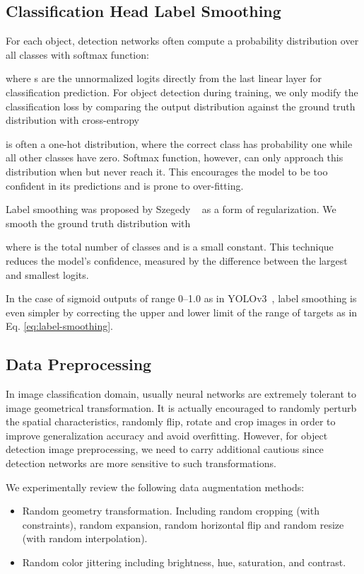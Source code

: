 \documentclass[10pt,twocolumn,letterpaper]{article}
\begin{document}
\subsection{Classification Head Label Smoothing}
For each object, detection networks often compute a probability distribution over all classes with softmax function:



where s are the unnormalized logits directly from the last linear layer for classification prediction. For object detection during training, we only modify the classification loss by comparing the output distribution  against the ground truth distribution  with cross-entropy



 is often a one-hot distribution, where the correct class has probability one while all other classes have zero. Softmax function, however, can only approach this distribution when  but never reach it. This encourages the model to be too confident in its predictions and is prone to over-fitting.

Label smoothing was proposed by Szegedy \etal~\cite{szegedy2016rethinking} as a form of regularization. We smooth the ground truth distribution with

where  is the total number of classes and  is a small constant. This technique reduces the model's confidence, measured by the difference between the largest and smallest logits.

In the case of sigmoid outputs of range \numrange{0}{1.0} as in YOLOv3~\cite{redmon2018yolov3}, label smoothing is even simpler by correcting the upper and lower limit of the range of targets as in Eq. \ref{eq:label-smoothing}.

\subsection{Data Preprocessing}
In image classification domain, usually neural networks are extremely tolerant to image geometrical transformation. It is actually encouraged to randomly perturb the spatial characteristics, \eg randomly flip, rotate and crop images in order to improve generalization accuracy and avoid overfitting. However, for object detection image preprocessing,  we need to carry additional cautious since detection networks are more sensitive to such transformations. 

We experimentally review the following data augmentation methods:

\begin{itemize}
   \item Random geometry transformation. Including random cropping (with constraints), random expansion, random horizontal flip and random resize (with random interpolation).
   \item Random color jittering including brightness, hue, saturation, and contrast.
\end{itemize}
\end{document}
